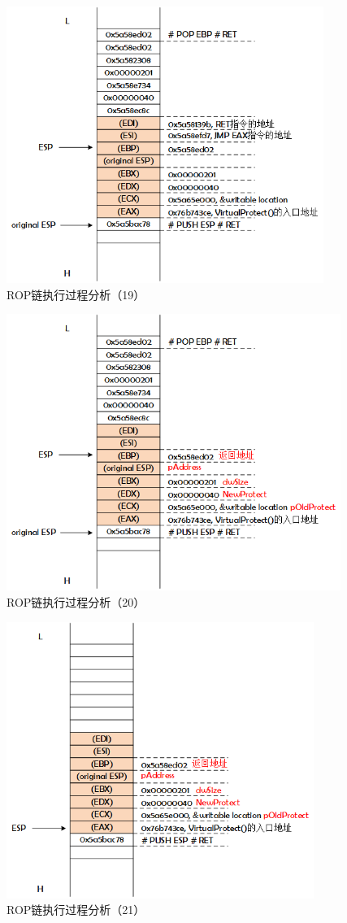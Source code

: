 \documentclass[bachelor]{thesis-uestc}
\begin{document}
\begin{figure}[htbp]
	\centering\includegraphics[height=9cm]{images/rop_chain_s19.png}
	\caption{ROP链执行过程分析（19）}
	\label{fig:rop_chain_s19}
\end{figure}

\begin{figure}[htbp]
	\centering\includegraphics[height=9cm]{images/rop_chain_s20.png}
	\caption{ROP链执行过程分析（20）}
	\label{fig:rop_chain_s20}
\end{figure}

\begin{figure}[htbp]
	\centering\includegraphics[height=9cm]{images/rop_chain_s21.png}
	\caption{ROP链执行过程分析（21）}
	\label{fig:rop_chain_s21}
\end{figure}
\end{document}
